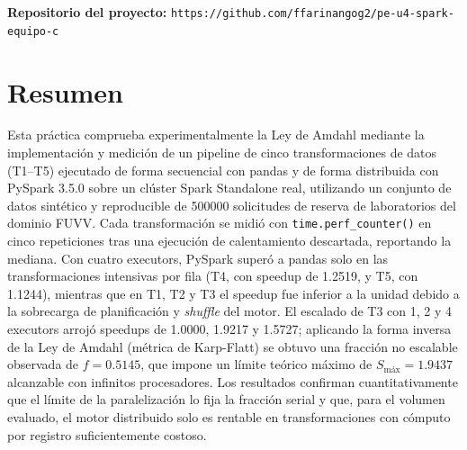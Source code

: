 \documentclass[10pt,journal]{IEEEtran}
\begin{document}
\vspace{1.0em}
\noindent\textbf{Repositorio del proyecto:}
\texttt{https://github.com/ffarinangog2/pe-u4-spark-equipo-c}

\clearpage


\section*{Resumen}
Esta pr\'actica comprueba experimentalmente la Ley de Amdahl mediante la
implementaci\'on y medici\'on de un pipeline de cinco transformaciones de datos
(T1--T5) ejecutado de forma secuencial con pandas y de forma distribuida con
PySpark 3.5.0 sobre un cl\'uster Spark Standalone real, utilizando un conjunto de
datos sint\'etico y reproducible de \num{500000} solicitudes de reserva de
laboratorios del dominio FUVV. Cada transformaci\'on se midi\'o con
\texttt{time.perf\_counter()} en cinco repeticiones tras una ejecuci\'on de
calentamiento descartada, reportando la mediana. Con cuatro executors, PySpark
super\'o a pandas solo en las transformaciones intensivas por fila (T4, con
speedup de \num{1.2519}, y T5, con \num{1.1244}), mientras que en T1, T2 y T3 el
speedup fue inferior a la unidad debido a la sobrecarga de planificaci\'on y
\emph{shuffle} del motor. El escalado de T3 con 1, 2 y 4 executors arroj\'o
speedups de \num{1.0000}, \num{1.9217} y \num{1.5727}; aplicando la forma inversa
de la Ley de Amdahl (m\'etrica de Karp-Flatt) se obtuvo una fracci\'on no
escalable observada de $f = \num{0.5145}$, que impone un l\'imite te\'orico
m\'aximo de $S_{\text{m\'ax}} = \num{1.9437}$ alcanzable con infinitos
procesadores. Los resultados confirman cuantitativamente que el l\'imite de la
paralelizaci\'on lo fija la fracci\'on serial y que, para el volumen evaluado, el
motor distribuido solo es rentable en transformaciones con c\'omputo por registro
suficientemente costoso.
\end{document}
